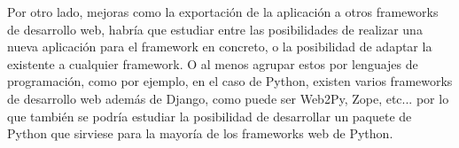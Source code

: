 Por otro lado, mejoras como la exportación de la aplicación a otros frameworks
de desarrollo web, habría que estudiar entre las posibilidades de realizar una
nueva aplicación para el framework en concreto, o la posibilidad de adaptar la
existente a cualquier framework. O al menos agrupar estos por lenguajes de
programación, como por ejemplo, en el caso de Python, existen varios frameworks
de desarrollo web además de Django, como puede ser Web2Py, Zope, etc... por lo
que también se podría estudiar la posibilidad de desarrollar un paquete de Python
que sirviese para la mayoría de los frameworks web de Python.



